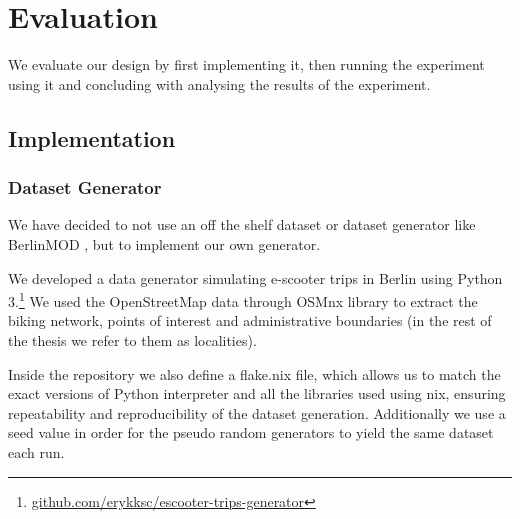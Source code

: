 \section{Evaluation}
\label{cha:evaluation}

We evaluate our design by first implementing it, then running the experiment using it and concluding with analysing the results of the experiment.

\subsection{Implementation}
\label{sec:implementation}

\subsubsection{Dataset Generator}
We have decided to not use an off the shelf dataset or dataset generator like BerlinMOD \cite{duntgenBerlinMODBenchmarkMoving2009}, but to implement our own generator.

We developed a data generator simulating e-scooter trips in Berlin using Python 3.\footnote{\url{github.com/erykksc/escooter-trips-generator}}
We used the OpenStreetMap data through OSMnx library to extract the biking network, points of interest and administrative boundaries (in the rest of the thesis we refer to them as localities).

Inside the repository we also define a flake.nix file, which allows us to match the exact versions of Python interpreter and all the libraries used using nix, ensuring repeatability and reproducibility of the dataset generation.
Additionally we use a seed value in order for the pseudo random generators to yield the same dataset each run.


